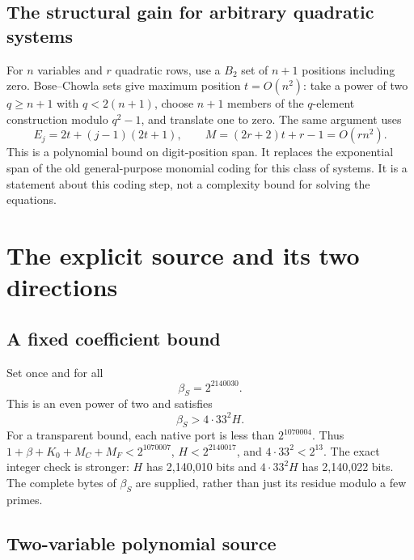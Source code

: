 \documentclass[11pt]{article}
\theoremstyle{definition}
\theoremstyle{remark}
\numberwithin{equation}{section}
\begin{document}
\subsection{The structural gain for arbitrary quadratic systems}

For \(n\) variables and \(r\) quadratic rows, use a \(B_2\) set of \(n+1\)
positions including zero. Bose--Chowla sets give maximum position
\(t=O(n^2)\): take a power of two \(q\ge n+1\) with \(q<2(n+1)\), choose
\(n+1\) members of the \(q\)-element construction modulo \(q^2-1\), and
translate one to zero. The same argument uses
\[
 E_j=2t+(j-1)(2t+1),\qquad
 M=(2r+2)t+r-1=O(rn^2).
\]
This is a polynomial bound on digit-position span. It replaces the
exponential span of the old general-purpose monomial coding for this
class of systems. It is a statement about this coding step, not a
complexity bound for solving the equations.

\section{The explicit source and its two directions}
\label{sec:source}

\subsection{A fixed coefficient bound}

Set once and for all
\begin{equation}\label{eq:betasource}
 \beta_S=2^{2140030}.
\end{equation}
This is an even power of two and satisfies
\begin{equation}\label{eq:betabound}
 \beta_S>4\cdot33^2 H.
\end{equation}
For a transparent bound, each native port is less than \(2^{1070004}\).
Thus \(1+\beta+K_0+M_C+M_F<2^{1070007}\),
\(H<2^{2140017}\), and \(4\cdot33^2<2^{13}\).
The exact integer check is stronger: \(H\) has 2,140,010 bits and
\(4\cdot33^2H\) has 2,140,022 bits.
The complete bytes of \(\beta_S\) are supplied, rather than just its
residue modulo a few primes.

\subsection{Two-variable polynomial source}
\end{document}
